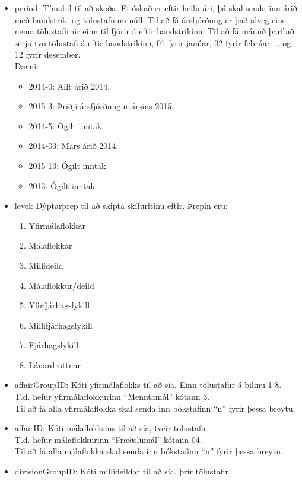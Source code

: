 \documentclass{article}
\theoremstyle{blueP}
\theoremstyle{greenS}
\begin{document}
\begin{itemize}
    \item period: Tímabil til að skoða. Ef óskað er eftir heilu ári, þá skal senda inn árið með bandstriki og tölustafnum núll. Til að fá ársfjórðung er það alveg eins nema tölustafirnir einn til fjórir á eftir bandstrikinu. Til að fá mánuð þarf að setja tvo tölustafi á eftir bandstrikinu, 01 fyrir janúar, 02 fyrir febrúar ... og 12 fyrir desember. \\ Dæmi:
    \begin{itemize}
        \item 2014-0: Allt árið 2014.
        \item 2015-3: Þriðji ársfjórðungur ársins 2015.
        \item  2014-5: Ógilt inntak
        \item 2014-03: Mars árið 2014.
        \item 2015-13: Ógilt inntak.
        \item 2013: Ógilt inntak.
    \end{itemize}
    \item level: Dýptarþrep til að skipta skífuritinu eftir. Þrepin eru:
    \begin{enumerate}[start=0]
        \item Yfirmálaflokkar
        \item Málaflokkar
        \item Millideild
        \item Málaflokkur/deild
        \item Yfirfjárhagslykill
        \item Millifjárhagslykill
        \item Fjárhagslykill
        \item Lánardrottnar
    \end{enumerate}
    \item affairGroupID: Kóti yfirmálaflokks til að sía. Einn tölustafur á bilinu 1-8. \\
    T.d. hefur yfirmálaflokkurinn ``Menntamál'' kótann 3. \\
    Til að fá alla yfirmálaflokka skal senda inn bókstafinn ``n'' fyrir þessa breytu.
    \item affairID: Kóti málaflokksins til að sía, tveir tölustafir. \\
    T.d. hefur málaflokkurinn ``Fræðslumál'' kótann 04. \\
    Til að fá alla málaflokka skal senda inn bókstafinn ``n'' fyrir þessa breytu.
    \item divisionGroupID: Kóti millideildar til að sía, þrír tölustafir. \\

\end{itemize}
\end{document}

